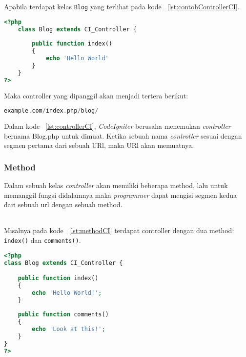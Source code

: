 Apabila terdapat kelas \texttt{Blog} yang terlihat pada kode ~\ref{lst:contohControllerCI}.
\begin{lstlisting}[style=customphp, language=PHP, basicstyle=\ttfamily, frame=single, columns=fullflexible, keepspaces=true, breaklines=true, showstringspaces=false, label={lst:contohControllerCI}, caption=Contoh controller pada codeIgniter.] 
<?php
	class Blog extends CI_Controller {
	
		public function index()
		{
			echo 'Hello World'
		}
	}
?>
\end{lstlisting} 



Maka controller yang dipanggil akan menjadi tertera berikut:
\begin{lstlisting}[style=customphp, language=PHP, basicstyle=\ttfamily, frame=single, columns=fullflexible, keepspaces=true, breaklines=true, showstringspaces=false, label={lst:controllerCI}, caption=Controller pada codeIgniter.] 
example.com/index.php/blog/
\end{lstlisting}

Dalam kode ~\ref{lst:controllerCI}, \textit{CodeIgniter} berusaha menemukan \textit{controller} bernama Blog.php untuk dimuat. Ketika sebuah nama \textit{controller} sesuai dengan segmen pertama dari sebuah URl, maka URl akan memuatnya. 

\subsubsection{Method}
Dalam sebuah kelas \textit{controller} akan memiliki beberapa method, lalu untuk memanggil fungsi didalamnya maka \textit{programmer} dapat mengisi segmen kedua dari sebuah url dengan sebuah method. 

\\ \noindent
Misalnya pada kode ~\ref{lst:methodCI} terdapat controller dengan dua method: \texttt{index()} dan \texttt{comments()}.

\begin{lstlisting}[style=customphp, language=PHP, basicstyle=\ttfamily, frame=single, columns=fullflexible, keepspaces=true, breaklines=true, showstringspaces=false, label={lst:methodCI}, caption=Controller pada codeIgniter.] 
<?php
class Blog extends CI_Controller {

	public function index()
	{
		echo 'Hello World!';
	}
	
	public function comments()
	{
		echo 'Look at this!';
	}
}
?>
\end{lstlisting}


